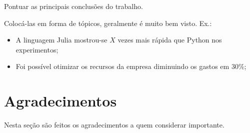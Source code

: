 \documentclass{modelo_banner}
\begin{document}
\begin{multicols}{2}
		Pontuar as principais conclusões do trabalho. 
		
		Colocá-las em forma de tópicos, geralmente é muito bem visto. Ex.:
		
		\begin{itemize}
			\item A linguagem Julia mostrou-se $X$ vezes mais rápida que Python nos experimentos;
			
			\item Foi possível otimizar os recursos da empresa diminuindo os gastos em 30\%;
		\end{itemize}
		
		\section{Agradecimentos}
		
		Nesta seção são feitos os agradecimentos a quem considerar importante.
		
		
	\end{multicols}
	
	\rodape
\end{document}
